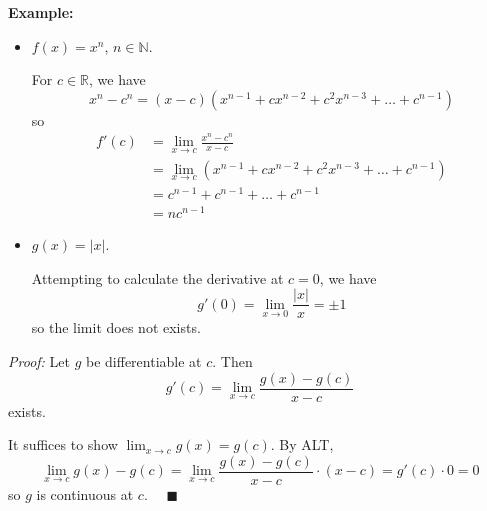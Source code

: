 \documentclass[12pt]{report}
\newcommand{\R}{\mathbb{R}}
\newcommand{\N}{\mathbb{N}}
\newcommand{\qed}{\quad \blacksquare}
\newcommand{\abs}[1]{\left\vert #1 \right\vert}
\newenvironment*{tbox}[2][gray]{
    \begin{tcolorbox}[
        parbox=false,
        colback=#1!5!white,
        colframe=#1!75!black,
        breakable,
        title={#2}
    ]}
    {\end{tcolorbox}}
\begin{document}
    \textbf{Example:}
    \begin{itemize}
        \item $f(x) = x^n$, $n \in \N$. 
        
        For $c \in \R$, we have 
        \[x^n - c^n = (x-c)(x^{n-1} + cx^{n-2} + c^2x^{n-3} + \dots + c^{n-1})\]
        so 
        \begin{align*}
            f'(c) &= \lim_{x \to c} \frac{x^n - c^n}{x - c}\\ 
            &= \lim_{x \to c} (x^{n-1} + cx^{n-2} + c^2x^{n-3} + \dots + c^{n-1})\\ 
            &= c^{n-1} + c^{n-1} + \dots + c^{n-1}\\ 
            &= nc^{n-1} 
        \end{align*} 

        \item $g(x) = \abs{x}$. 
        
        Attempting to calculate the derivative at $c = 0$, we have 
        \[g'(0) = \lim_{x \to 0} \frac{\abs{x}}{x} = \pm 1\]
        so the limit does not exists. 
    \end{itemize}

    \begin{tbox}{\textbf{Theorem:} If $g: A \to \R$ is differentiable at $c \in A$, then $g$ is continuous at $c$.}
        \emph{Proof:} Let $g$ be differentiable at $c$. Then 
        \[g'(c) = \lim_{x \to c} \frac{g(x) - g(c)}{x - c}\]
        exists. 

        It suffices to show $\lim_{x \to c} g(x) = g(c)$. By ALT, 
        \[\lim_{x \to c} g(x) - g(c) = \lim_{x \to c} \frac{g(x) - g(c)}{x - c} \cdot (x - c) = g'(c) \cdot 0 = 0\]
        so $g$ is continuous at $c$. $\qed$
    \end{tbox}
\end{document}
